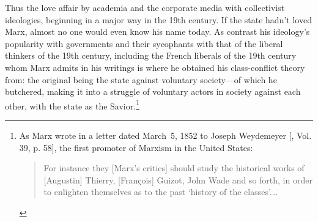 \documentclass[letterpaper,12pt]{article}
\begin{document}
Thus the love affair by academia and the corporate media with collectivist ideologies, beginning in a major way in the 19th century. If the state hadn't loved Marx, almost no one would even know his name today. As contrast his ideology's popularity with governments and their sycophants with that of the liberal thinkers of the 19th century, including the French liberals of the 19th century whom Marx admits in his writings is where he obtained his class-conflict theory from: the original being the state against voluntary society---of which he butchered, making it into a struggle of voluntary actors in society against each other, with the state as the Savior.\footnote{As Marx wrote in a letter dated March~5, 1852 to Joseph Weydemeyer [, Vol. 39, p. 58], the first promoter of Marxism in the United States: \begin{quotation}
For instance they [Marx's critics] should study the historical works of [Augustin] Thierry, [Fran\c{c}ois] Guizot, John Wade and so forth, in order to enlighten themselves as to the past `history of the classes'.\thinspace\ldots


\end{quotation}}
\end{document}

